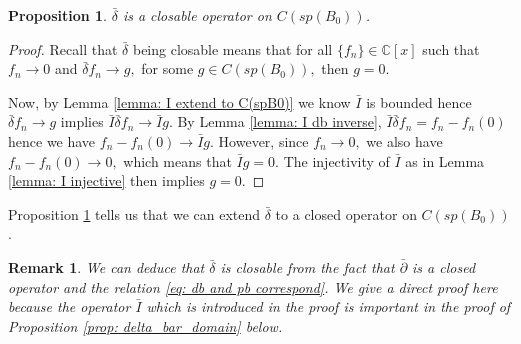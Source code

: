 \documentclass[12pt]{article}
\newtheorem{remark}[definition]{Remark}
\newtheorem{proposition}[definition]{Proposition}
\numberwithin{equation}{section}
\def\pb{\bar{\partial}}
\def\db{\bar{\delta}}
\def\C{{\mathbb C}}
\def\I{\bar{I}}
\def\d{\bar{\delta}}
\begin{document}
\begin{proposition}\label{prop: db is closable}
    $\db$ is a closable operator on $C(sp(B_0))$.
\end{proposition}
\begin{proof}
    Recall that $\d$ being closable means that for all $\{f_n\} \in \C[x]$ such that $f_n \to 0$ and $\d f_n \to g,$ for some $g \in C(sp(B_0)),$ then $g = 0.$ 
    
    Now, by Lemma \ref{lemma: I extend to C(spB0)} we know $\I$ is bounded hence $\d f_n \to g$ implies $\I \d f_n \to \I g$. By Lemma \ref{lemma: I db inverse}, $\I \d f_n=f_n - f_n(0)$ hence we have $f_n - f_n(0) \to \I g.$ However, since $f_n \to 0,$  we also have $f_n - f_n(0) \to 0,$ which means that $\I g = 0.$ The injectivity of $\I$ as in Lemma \ref{lemma: I injective} then implies  $g=0$.
\end{proof}

Proposition \ref{prop: db is closable} tells us that we can extend $\db$ to a closed operator on $C(sp(B_0))$.

\begin{remark}
    We can deduce that $\db$ is closable from the fact that $\pb$ is a closed operator and the relation \eqref{eq: db and pb correspond}. We give a direct proof here because the operator $\I$ which is introduced in the proof is important in the proof of Proposition \ref{prop: delta_bar_domain} below.
\end{remark}
\end{document}
